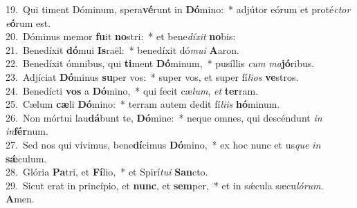 {19.~}Qui timent Dóminum, spera\textbf{vé}runt in \textbf{Dó}mino:~* adjútor eórum et proté\textit{ctor} \textit{e}\textbf{ó}rum est.\\
{20.~}Dóminus memor \textbf{fu}it \textbf{no}stri:~* et bene\textit{dí}\textit{xit} \textbf{no}bis:\\
{21.~}Benedíxit \textbf{dó}mui \textbf{Is}raël:~* benedíxit dó\textit{mu}\textit{i} \textbf{A}aron.\\
{22.~}Benedíxit ómnibus, qui \textbf{ti}ment \textbf{Dó}minum,~* pusíllis \textit{cum} \textit{ma}\textbf{jó}ribus.\\
{23.~}Adjíciat \textbf{Dó}minus \textbf{su}per vos:~* super vos, et super fí\textit{li}\textit{os} \textbf{ve}stros.\\
{24.~}Benedícti \textbf{vos} a \textbf{Dó}mino,~* qui fecit cæ\textit{lum}, \textit{et} \textbf{ter}ram.\\
{25.~}Cælum \textbf{cæ}li \textbf{Dó}mino:~* terram autem dedit fí\textit{li}\textit{is} \textbf{hó}minum.\\
{26.~}Non mórtui lau\textbf{dá}bunt te, \textbf{Dó}mine:~* neque omnes, qui descéndunt \textit{in} \textit{in}\textbf{fér}num.\\
{27.~}Sed nos qui vívimus, bene\textbf{dí}cimus \textbf{Dó}mino,~* ex hoc nunc et us\textit{que} \textit{in} \textbf{sǽ}culum.\\
{28.~}Glória \textbf{Pa}tri, et \textbf{Fí}lio,~* et Spirí\textit{tu}\textit{i} \textbf{San}cto.\\
{29.~}Sicut erat in princípio, et \textbf{nunc}, et \textbf{sem}per,~* et in sǽcula sæcu\textit{ló}\textit{rum}. \textbf{A}men.\\
